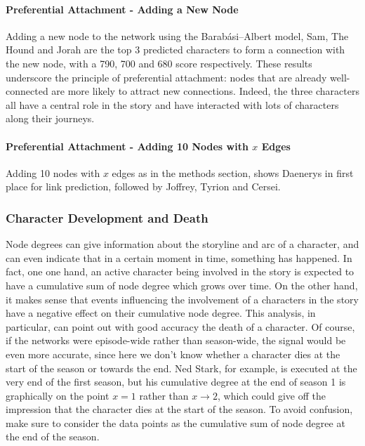\documentclass[10pt,twocolumn,letterpaper]{article}
\begin{document}
\paragraph{Preferential Attachment - Adding a New Node}

Adding a new node to the network using the Barabási–Albert model, Sam, The Hound and Jorah are the top 3 predicted characters to form a connection with the new node, with a 790, 700 and 680 score respectively. These results underscore the principle of preferential attachment: nodes that are already well-connected are more likely to attract new connections. Indeed, the three characters all have a central role in the story and have interacted with lots of characters along their journeys.

\paragraph{Preferential Attachment - Adding 10 Nodes with $x$ Edges}

Adding 10 nodes with $x$ edges as in the methods section, shows Daenerys in first place for link prediction, followed by Joffrey, Tyrion and Cersei.

\subsubsection{Character Development and Death}

Node degrees can give information about the storyline and arc of a character, and can even indicate that in a certain moment in time, something has happened.
In fact, one one hand, an active character being involved in the story is expected to have a cumulative sum of node degree which grows over time. On the other hand, it makes sense that events influencing the involvement of a characters in the story have a negative effect on their cumulative node degree. This analysis, in particular, can point out with good accuracy the death of a character. Of course, if the networks were episode-wide rather than season-wide, the signal would be even more accurate, since here we don't know whether a character dies at the start of the season or towards the end. Ned Stark, for example, is executed at the very end of the first season, but his cumulative degree at the end of season 1 is graphically on the point $x=1$ rather than $x\xrightarrow{}2$, which could give off the impression that the character dies at the start of the season. To avoid confusion, make sure to consider the data points as the cumulative sum of node degree at the end of the season. 
\end{document}

